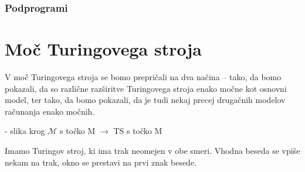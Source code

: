 \documentclass[10pt,a4paper,oneside]{book}
\begin{document}
\subsubsection{Podprogrami}
\fixme

\section{Moč Turingovega stroja}
V moč Turingovega stroja se bomo prepričali na dva načina -- tako, da bomo pokazali, da so različne razširitve Turingovega stroja enako močne kot osnovni model, ter tako, da bomo pokazali, da je tudi nekaj precej drugačnih modelov računanja enako močnih.


\fixme - slika krog $\mathcal{M}$ s točko M $\rightarrow$ TS s točko M

Imamo Turingov stroj, ki ima trak neomejen v obe smeri. Vhodna beseda se vpiše nekam na trak, okno se prestavi na prvi znak besede.
\end{document}
